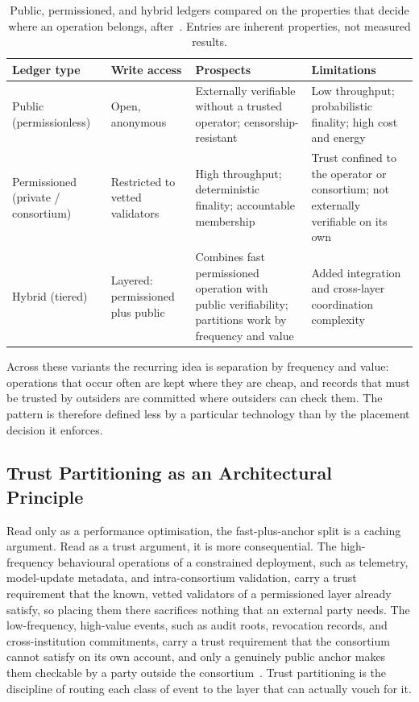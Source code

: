 \begin{table}[!htbp]
  \centering
  \footnotesize
  \setlength{\tabcolsep}{4pt}
  \renewcommand{\arraystretch}{1.25}
  \caption{Public, permissioned, and hybrid ledgers compared on the properties that decide where an operation belongs, after~\cite{al2024shbf}. Entries are inherent properties, not measured results.}
  \label{tab:ledger-types}
  \begin{tabularx}{\textwidth}{@{}
      >{\raggedright\arraybackslash}p{2.3cm}
      >{\raggedright\arraybackslash}p{2.3cm}
      >{\raggedright\arraybackslash}X
      >{\raggedright\arraybackslash}X@{}}
    \toprule
    \textbf{Ledger type} & \textbf{Write access} & \textbf{Prospects} & \textbf{Limitations} \\
    \midrule
    Public (permissionless) & Open, anonymous & Externally verifiable without a trusted operator; censorship-resistant & Low throughput; probabilistic finality; high cost and energy \\
    \addlinespace
    Permissioned (private / consortium) & Restricted to vetted validators & High throughput; deterministic finality; accountable membership & Trust confined to the operator or consortium; not externally verifiable on its own \\
    \addlinespace
    Hybrid (tiered) & Layered: permissioned plus public & Combines fast permissioned operation with public verifiability; partitions work by frequency and value & Added integration and cross-layer coordination complexity \\
    \bottomrule
  \end{tabularx}
\end{table}

Across these variants the recurring idea is separation by frequency and value:
operations that occur often are kept where they are cheap, and records that must
be trusted by outsiders are committed where outsiders can check them. The
pattern is therefore defined less by a particular technology than by the
placement decision it enforces.

\subsection{Trust Partitioning as an Architectural Principle}
\label{subsec:trust-partitioning}

Read only as a performance optimisation, the fast-plus-anchor split is a caching
argument. Read as a trust argument, it is more consequential. The high-frequency
behavioural operations of a constrained deployment, such as telemetry,
model-update metadata, and intra-consortium validation, carry a trust
requirement that the known, vetted validators of a permissioned layer already
satisfy, so placing them there sacrifices nothing that an external party needs.
The low-frequency, high-value events, such as audit roots, revocation records,
and cross-institution commitments, carry a trust requirement that the consortium
cannot satisfy on its own account, and only a genuinely public anchor makes them
checkable by a party outside the consortium~\cite{wang2024public}. Trust
partitioning is the discipline of routing each class of event to the layer that
can actually vouch for it.

